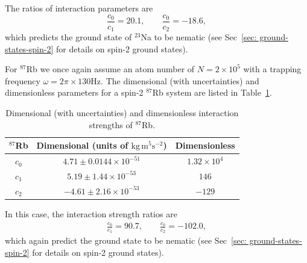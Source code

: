 The ratios of interaction parameters are
\begin{equation}
    \frac{c_0}{c_1} = 20.1, \qquad \frac{c_0}{c_2} = -18.6,
\end{equation}
which predicts the ground state of \( ^{23}\)Na to be nematic (see
Sec~\ref{sec: ground-states-spin-2} for details on spin-2 ground states).

For \( ^{87}\)Rb we once again assume an atom number of \(N=2\times10^5\) with a
trapping frequency \(\omega = 2\pi \times 130\)Hz.
The dimensional (with uncertainties) and dimensionless parameters for a spin-2
\( ^{87}\)Rb system are listed in
Table~\ref{table: spin-2-interactions-rb87}.
\begin{table}[!htbp]
    \centering
    \begin{tabular}{ccc}
        \toprule
        \( ^{87}\)Rb & Dimensional (units of \(\text{kg}\, \text{m}^5
        \text{s}^{-2} \)) & Dimensionless \\
        \midrule
        \(c_0\) & \(4.71 \pm 0.0144 \times 10^{-51}\) & \(1.32\times10^4\) \\
        \(c_1\) & \(5.19 \pm 1.44 \times 10^{-53}\) & \(146\) \\
        \(c_2\) & \(-4.61 \pm 2.16 \times 10^{-53}\) & \(-129\) \\
        \bottomrule
    \end{tabular}
    \caption{\label{table: spin-2-interactions-rb87}Dimensional (with
    uncertainties) and dimensionless interaction strengths of \( ^{87}\)Rb.}
\end{table}
In this case, the interaction strength ratios are
\begin{align}
    \frac{c_0}{c_1} = 90.7, \qquad \frac{c_0}{c_2} = -102.0,
\end{align}
which again predict the ground state to be nematic (see
Sec~\ref{sec: ground-states-spin-2} for details on spin-2 ground states).
